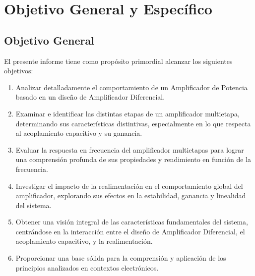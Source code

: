
\section{Objetivo General y Específico}
\subsection{Objetivo General}
El presente informe tiene como propósito primordial alcanzar los siguientes objetivos:

\begin{enumerate}
    \item Analizar detalladamente el comportamiento de un Amplificador de Potencia basado en un diseño de Amplificador Diferencial.
    \item Examinar e identificar las distintas etapas de un amplificador multietapa, determinando sus características distintivas, especialmente en lo que respecta al acoplamiento capacitivo y su ganancia.
    \item Evaluar la respuesta en frecuencia del amplificador multietapas para lograr una comprensión profunda de sus propiedades y rendimiento en función de la frecuencia.
    \item Investigar el impacto de la realimentación en el comportamiento global del amplificador, explorando sus efectos en la estabilidad, ganancia y linealidad del sistema.
    \item Obtener una visión integral de las características fundamentales del sistema, centrándose en la interacción entre el diseño de Amplificador Diferencial, el acoplamiento capacitivo, y la realimentación.
    \item Proporcionar una base sólida para la comprensión y aplicación de los principios analizados en contextos electrónicos.
\end{enumerate}


